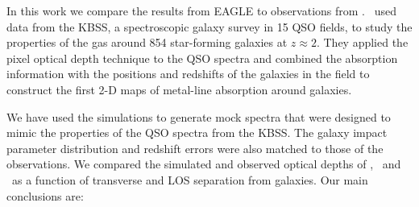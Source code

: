 \documentclass[useAMS,usenatbib,letterpaper]{mn2e}
\def\obspaper{\citetalias{turner14}}
\begin{document}
In this work we compare the results from EAGLE to observations from \obspaper.
\obspaper\ used data from the KBSS, a spectroscopic galaxy survey in 15 QSO fields,
to study the properties of the gas around 854 star-forming galaxies at $z\approx2$.
They applied the pixel optical depth technique to the QSO spectra
and combined the absorption information with the positions and redshifts of 
the galaxies in the field to construct the first 2-D maps of metal-line absorption
around galaxies. 

We have used the simulations to generate mock spectra that were designed
to mimic the properties of the QSO spectra from the KBSS.
The galaxy impact parameter distribution and redshift errors were also matched
to those of the observations. We compared 
the simulated and observed optical depths of \hone, \cfour\ and \sifour\ as 
a function of transverse and LOS separation from galaxies. 
 Our main conclusions are:
\end{document}
